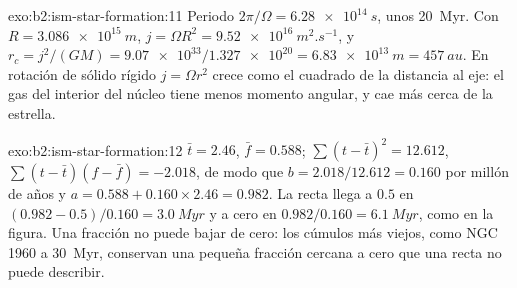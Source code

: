 \begin{solution}{exo:b2:ism-star-formation:11}
Periodo $2\pi/\Omega = \qty{6.28e14}{s}$, unos \qty{20}{Myr}. Con
$R = \qty{3.086e15}{m}$, $j = \Omega R^2 = \qty{9.52e16}{m^2.s^{-1}}$, y
$r_c = j^2/(GM) = \num{9.07e33}/\num{1.327e20} = \qty{6.83e13}{m} = \qty{457}{au}$.
En rotación de sólido rígido $j = \Omega r^2$ crece como el cuadrado de la distancia al eje:
el gas del interior del núcleo tiene menos momento angular, y cae más cerca de la estrella.
\end{solution}

\begin{solution}{exo:b2:ism-star-formation:12}
$\bar t = 2.46$, $\bar f = 0.588$; $\sum(t - \bar t)^2 = 12.612$,
$\sum(t - \bar t)(f - \bar f) = -2.018$, de modo que $b = 2.018/12.612 = 0.160$ por millón
de años y $a = 0.588 + 0.160\times2.46 = 0.982$. La recta llega a $0.5$ en
$(0.982 - 0.5)/0.160 = \qty{3.0}{Myr}$ y a cero en $0.982/0.160 = \qty{6.1}{Myr}$, como en
la figura. Una fracción no puede bajar de cero: los cúmulos más viejos, como NGC 1960 a
\qty{30}{Myr}, conservan una pequeña fracción cercana a cero que una recta no puede describir.
\end{solution}

